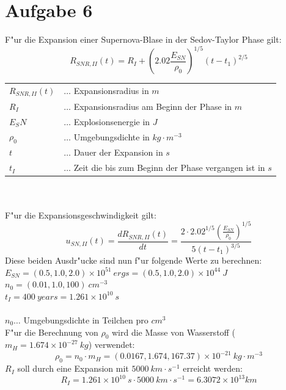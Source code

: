 \section{Aufgabe 6}
F"ur die Expansion einer Supernova-Blase in der Sedov-Taylor Phase gilt:
\begin{equation}
R_{SNR,II}(t)=R_I + \left( 2.02 \frac{E_{SN}}{\rho_0} \right) ^{1/5}(t-t_1)^{2/5}
\end{equation}
\begin{tabular}{l l}
\(R_{SNR,II}(t)\)&\(\dots\) Expansionsradius in \(m\)\\
\(R_I\)&\(\dots\) Expansionsradius am Beginn der Phase in \(m\)\\
\(E_SN\)&\(\dots\) Explosionsenergie in \(J\)\\
\(\rho_0\)&\(\dots\) Umgebungsdichte in \(kg \cdot m^{-3}\)\\
\(t\)&\(\dots\) Dauer der Expansion in \(s\)\\
\(t_I\)&\(\dots\) Zeit die bis zum Beginn der Phase vergangen ist in \(s\)\\
\end{tabular}\\
\\
F"ur die Expansionsgeschwindigkeit gilt:
\begin{equation}
u_{SN,II}(t) = \frac{dR_{SNR,II}(t)}{dt}=\frac{2 \cdot 2.02^{1/5} \left( \frac{E_{SN}}{\rho_0} \right) ^{1/5}}{5(t-t_1)^{3/5}}
\end{equation}
Diese beiden Ausdr"ucke sind nun f"ur folgende Werte  zu berechnen:\\
\(E_{SN}=(0.5,1.0,2.0) \times 10^{51}~ergs = (0.5,1.0,2.0) \times 10^{44}~J\)\\
\(n_0=(0.01,1.0,100)~cm^{-3}\)\\
\(t_I=400~years=1.261 \times 10^{10}~s\)\\
\\
\(n_0\dots\) Umgebungsdichte in Teilchen pro \(cm^3\)\\
\newpage
F"ur die Berechnung von \(\rho_0\) wird die Masse von Wasserstoff (\(m_H=1.674 \times 10^{-27}~kg\)) verwendet:
\begin{equation}
\rho_0=n_0 \cdot m_H=(0.0167,1.674,167.37) \times 10^{-21}~kg \cdot m^{-3}
\end{equation}
\(R_I\) soll durch eine Expansion mit \(5000~km \cdot s^{-1}\) erreicht werden:
\begin{equation}
R_I=1.261 \times 10^{10}~s \cdot 5000~km \cdot s^{-1} = 6.3072 \times 10^{13} km
\end{equation}
